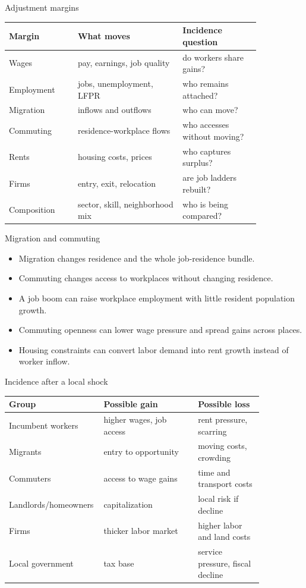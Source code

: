 \documentclass[aspectratio=169,11pt]{beamer}
\begin{document}
\begin{frame}{Adjustment margins}
\small
\begin{tabular}{p{0.23\linewidth} p{0.35\linewidth} p{0.26\linewidth}}
\toprule
Margin & What moves & Incidence question \\
\midrule
Wages & pay, earnings, job quality & do workers share gains? \\
Employment & jobs, unemployment, LFPR & who remains attached? \\
Migration & inflows and outflows & who can move? \\
Commuting & residence-workplace flows & who accesses without moving? \\
Rents & housing costs, prices & who captures surplus? \\
Firms & entry, exit, relocation & are job ladders rebuilt? \\
Composition & sector, skill, neighborhood mix & who is being compared? \\
\bottomrule
\end{tabular}
\end{frame}

\begin{frame}{Migration and commuting}
\begin{itemize}
    \item Migration changes residence and the whole job-residence bundle.
    \item Commuting changes access to workplaces without changing residence.
    \item A job boom can raise workplace employment with little resident population growth.
    \item Commuting openness can lower wage pressure and spread gains across places.
    \item Housing constraints can convert labor demand into rent growth instead of worker inflow.
\end{itemize}
\end{frame}

\begin{frame}{Incidence after a local shock}
\small
\begin{tabular}{p{0.24\linewidth} p{0.36\linewidth} p{0.25\linewidth}}
\toprule
Group & Possible gain & Possible loss \\
\midrule
Incumbent workers & higher wages, job access & rent pressure, scarring \\
Migrants & entry to opportunity & moving costs, crowding \\
Commuters & access to wage gains & time and transport costs \\
Landlords/homeowners & capitalization & local risk if decline \\
Firms & thicker labor market & higher labor and land costs \\
Local government & tax base & service pressure, fiscal decline \\
\bottomrule
\end{tabular}
\end{frame}
\end{document}
